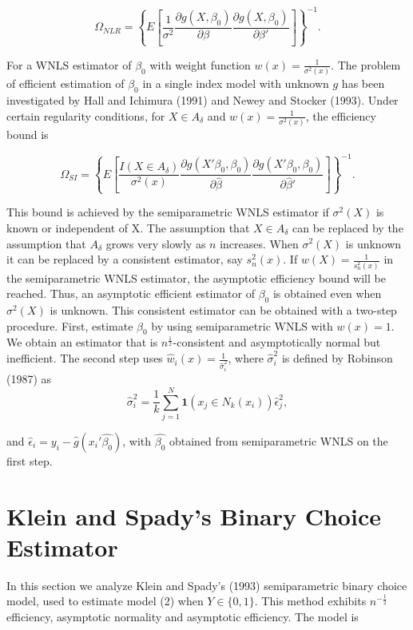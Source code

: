 \documentclass[a4paper]{article}
\begin{document}
\[ \Omega_{NLR} = \left\{E\left[\frac{1}{\sigma^2}\frac{\partial g(X, \beta_0)}{\partial \beta} \frac{\partial g(X, \beta_0)}{\partial \beta'}\right]\right\}^{-1}. \]

For a WNLS estimator of $\beta_0$ with weight function $w(x) = \frac{1}{\sigma^2(x)}$. The problem of efficient estimation of $\beta_0$ in a single index model with unknown $g$ has been investigated by Hall and Ichimura (1991) and Newey and Stocker (1993). Under certain regularity conditions, for $X \in A_{\delta}$ and $w(x) = \frac{1}{\sigma^2(x)}$, the efficiency bound is

\begin{equation}
\Omega_{SI} = \left\{ E\left[\frac{I(X \in A_{\delta})}{\sigma^2(x)}\frac{\partial g(X'\beta_0, \beta_0)}{\partial \hat{\beta}}\frac{\partial g(X'\beta_0, \beta_0)}{\partial \hat{\beta}'}\right] \right\}^{-1}.
\end{equation}


This bound is achieved by the semiparametric WNLS estimator if $\sigma^2(X)$ is known or independent of X. The assumption that $X \in A_{\delta}$ can be replaced by the assumption that $A_{\delta}$ grows very slowly as $n$ increases. When $\sigma^2(X)$ is unknown it can be replaced by a consistent estimator, say $s_{n}^{2}(x)$. If $w(X) = \frac{1}{s_{n}^{2}(x)}$ in the semiparametric WNLS estimator, the asymptotic efficiency bound will be reached. Thus, an asymptotic efficient estimator of $\beta_0$ is obtained even when $\sigma^2(X)$ is unknown. This consistent estimator can be obtained with a two-step procedure. First, estimate $\beta_0$ by using semiparametric WNLS with $w(x) = 1$. We obtain an estimator that is $n^{\frac{1}{2}}$-consistent and asymptotically normal but inefficient. The second step uses $\hat{w}_i(x) = \frac{1}{\hat{\sigma}_{i}^{2}}$, where  $\hat{\sigma}_{i}^{2}$ is defined by Robinson (1987) as 
\[\hat{\sigma}_{i}^{2} = \frac{1}{k}\sum_{j=1}^{N} \mathbf{1}{(x_j \in N_k(x_i))}\hat{\epsilon}_{j}^{2} ,\]

and $\hat{\epsilon}_i = y_i - \hat{g}(x_i'\hat{\beta_0})$, with $\hat{\beta_0}$ obtained from semiparametric WNLS on the first step.



\section{Klein and Spady's Binary Choice Estimator} %
\label{sec:section_about_references_within_the_document}
In this section we analyze Klein and Spady's (1993) semiparametric binary choice model, used to estimate model (2) when $Y \in \{0,1\}$.   This method exhibits $n^{-\frac{1}{2}}$ efficiency, asymptotic normality and asymptotic efficiency. The model is
\end{document}
